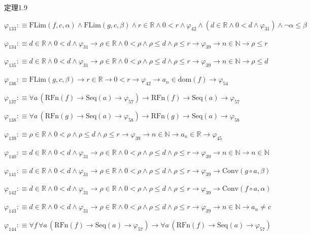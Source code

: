 \begin{fullproof}{定理1.9}
\begin{abbrevlist}
\item $\varphi_{133} :\equiv \mathrm{FLim}(f,c,\alpha) \land \mathrm{FLim}(g,c,\beta) \land r \in \mathbb{R} \land 0 < r \land \varphi_{42} \land (d \in \mathbb{R} \land 0 < d \land \varphi_{31}) \land \neg \alpha \leq \beta$
\item $\varphi_{134} :\equiv d \in \mathbb{R} \land 0 < d \land \varphi_{31} \to \rho \in \mathbb{R} \land 0 < \rho \land \rho \leq d \land \rho \leq r \to \varphi_{39} \to n \in \mathbb{N} \to \rho \leq r$
\item $\varphi_{135} :\equiv d \in \mathbb{R} \land 0 < d \land \varphi_{31} \to \rho \in \mathbb{R} \land 0 < \rho \land \rho \leq d \land \rho \leq r \to \varphi_{39} \to n \in \mathbb{N} \to \rho \leq d$
\item $\varphi_{136} :\equiv \mathrm{FLim}(g,c,\beta) \to r \in \mathbb{R} \to 0 < r \to \varphi_{42} \to a_{n} \in \mathrm{dom}(f) \to \varphi_{54}$
\item $\varphi_{137} :\equiv \forall a\,(\mathrm{RFn}(f) \to \mathrm{Seq}(a) \to \varphi_{57}) \to \mathrm{RFn}(f) \to \mathrm{Seq}(a) \to \varphi_{57}$
\item $\varphi_{138} :\equiv \forall a\,(\mathrm{RFn}(g) \to \mathrm{Seq}(a) \to \varphi_{58}) \to \mathrm{RFn}(g) \to \mathrm{Seq}(a) \to \varphi_{58}$
\item $\varphi_{139} :\equiv \rho \in \mathbb{R} \land 0 < \rho \land \rho \leq d \land \rho \leq r \to \varphi_{39} \to n \in \mathbb{N} \to a_{n} \in \mathbb{R} \to \varphi_{45}$
\item $\varphi_{140} :\equiv d \in \mathbb{R} \land 0 < d \land \varphi_{31} \to \rho \in \mathbb{R} \land 0 < \rho \land \rho \leq d \land \rho \leq r \to \varphi_{39} \to n \in \mathbb{N} \to n \in \mathbb{N}$
\item $\varphi_{141} :\equiv d \in \mathbb{R} \land 0 < d \land \varphi_{31} \to \rho \in \mathbb{R} \land 0 < \rho \land \rho \leq d \land \rho \leq r \to \varphi_{39} \to \mathrm{Conv}(g \circ a,\beta)$
\item $\varphi_{142} :\equiv d \in \mathbb{R} \land 0 < d \land \varphi_{31} \to \rho \in \mathbb{R} \land 0 < \rho \land \rho \leq d \land \rho \leq r \to \varphi_{39} \to \mathrm{Conv}(f \circ a,\alpha)$
\item $\varphi_{143} :\equiv d \in \mathbb{R} \land 0 < d \land \varphi_{31} \to \rho \in \mathbb{R} \land 0 < \rho \land \rho \leq d \land \rho \leq r \to \varphi_{39} \to n \in \mathbb{N} \to a_{n} \neq c$
\item $\varphi_{144} :\equiv \forall f\,\forall a\,(\mathrm{RFn}(f) \to \mathrm{Seq}(a) \to \varphi_{57}) \to \forall a\,(\mathrm{RFn}(f) \to \mathrm{Seq}(a) \to \varphi_{57})$

\end{abbrevlist}
\end{fullproof}
